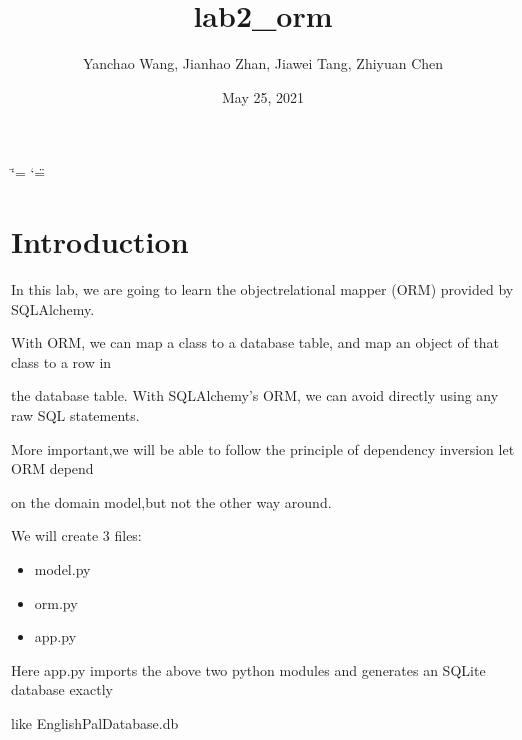 \documentclass[letterpaper,10pt,english]{sphinxmanual}
\title{lab2\_orm}
\date{May 25, 2021}
\author{Yanchao Wang, Jianhao Zhan, Jiawei Tang, Zhiyuan Chen}
\begin{document}
\ifdefined\shorthandoff
  \ifnum\catcode`\=\string=\active\shorthandoff{=}\fi
  \ifnum\catcode`\"=\active{}\fi
\fi

\pagestyle{empty}
\sphinxmaketitle
\pagestyle{plain}
\sphinxtableofcontents
\pagestyle{normal}
\label{\detokenize{index::doc}}



\chapter{Introduction}
\label{\detokenize{index:introduction}}
\begin{DUlineblock}{0em}
\item[]
\begin{DUlineblock}{\DUlineblockindent}
\item[] In this lab, we are going to learn the object\sphinxhyphen{}relational mapper (ORM) provided by SQLAlchemy.
\end{DUlineblock}
\item[] With ORM, we can map a class to a database table, and map an object of that class to a row in
\item[] the database table. With SQLAlchemy’s ORM, we can avoid directly using any raw SQL statements.
\item[] More important,we will be able to follow the principle of dependency inversion \textendash{} let ORM depend
\item[] on the domain model,but not the other way around.
\item[] 
\item[]
\begin{DUlineblock}{\DUlineblockindent}
\item[] We will create 3 files:
\end{DUlineblock}
\end{DUlineblock}
\begin{itemize}
\item {} 
model.py

\item {} 
orm.py

\item {} 
app.py

\end{itemize}

\begin{DUlineblock}{0em}
\item[]
\begin{DUlineblock}{\DUlineblockindent}
\item[] Here app.py imports the above two python modules and generates an SQLite database exactly
\end{DUlineblock}
\item[] like EnglishPalDatabase.db
\end{DUlineblock}
\end{document}
